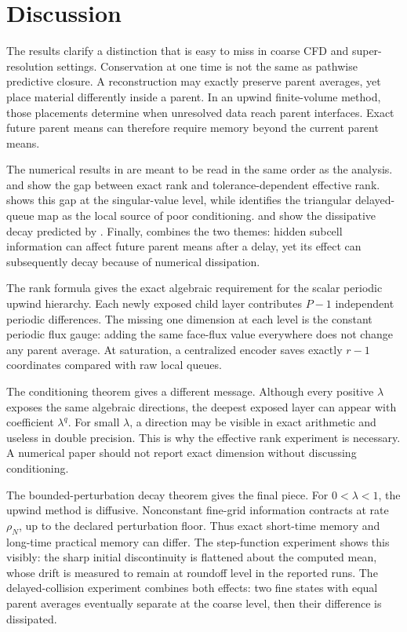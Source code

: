 \documentclass[pdflatex,sn-mathphys-num]{sn-jnl}%
\theoremstyle{thmstyleone}%
\theoremstyle{thmstyletwo}%
\theoremstyle{thmstylethree}%
\begin{document}
\section{Discussion} \label{sec:discussion}

The results clarify a distinction that is easy to miss in coarse CFD and
super-resolution settings.  Conservation at one time is not the same as
pathwise predictive closure.  A reconstruction may exactly preserve parent
averages, yet place material differently inside a parent.  In an upwind
finite-volume method, those placements determine when unresolved data reach
parent interfaces.  Exact future parent means can therefore require memory
beyond the current parent means.

The numerical results in  are meant to be read in the same order as
the analysis.   and  show the gap between exact rank and tolerance-dependent effective rank.  
shows this gap at the singular-value level, while
 identifies the triangular delayed-queue
map as the local source of poor conditioning.  
and  show the dissipative decay predicted by .  Finally,  combines the two themes: hidden subcell information can affect future parent means after a delay, yet its effect can subsequently decay because of numerical dissipation.

The rank formula gives the exact algebraic requirement for the scalar
periodic upwind hierarchy.  Each newly exposed child layer contributes
\(P-1\) independent periodic differences.  The missing one dimension at each level is the constant periodic flux gauge: adding the same face-flux value everywhere does not change any parent average.  At saturation, a centralized encoder saves exactly \(r-1\) coordinates compared with raw local queues.

The conditioning theorem gives a different message.  Although every positive \(\lambda\) exposes the same algebraic directions, the deepest exposed layer can appear with coefficient \(\lambda^q\).  For small \(\lambda\), a direction may be visible in exact arithmetic and useless in double precision.  This is why the effective rank experiment is necessary.  A numerical paper should not report exact dimension without discussing conditioning.

The bounded-perturbation decay theorem gives the final piece.  For
\(0<\lambda<1\), the upwind method is diffusive.  Nonconstant fine-grid
information contracts at rate \(\rho_N\), up to the declared perturbation floor.  Thus exact short-time memory and long-time practical memory can differ.  The step-function experiment shows this visibly: the sharp initial discontinuity is flattened about the computed mean, whose drift is measured to remain at roundoff level in the reported runs.  The delayed-collision experiment combines both effects: two fine states with equal parent averages eventually separate at the coarse level, then their difference is dissipated.
\end{document}
